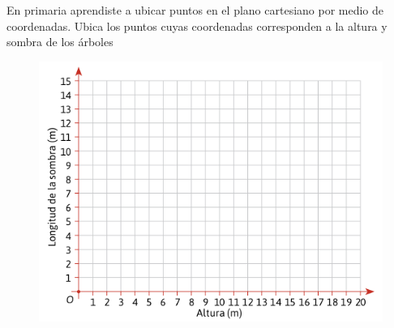 En primaria aprendiste a ubicar puntos en el plano cartesiano por medio de
coordenadas. Ubica los puntos cuyas coordenadas corresponden a la altura y sombra de los árboles

\begin{figure}[H]
    \centering
    \includegraphics[width=0.65\linewidth]{../images/plano_sombras}
    \label{fig:plano_sombras}
\end{figure}

